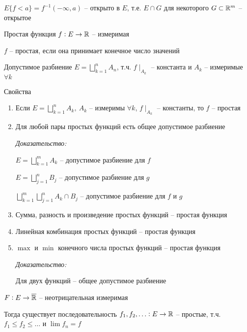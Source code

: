 \documentclass[12pt]{article}
\begin{document}
$E\{f < a\} = f^{-1}(-\infty, a)$ -- открыто в $E$, т.е. $E \cap G$ для некоторого $G \subset \mathbb R^m$ -- открытое 

\begin{defin}{Простая функция}
    $f : E \to \mathbb R$ -- измеримая

    $f$ -- простая, если она принимает конечное число значений 
\end{defin}

\begin{defin}{Допустимое разбиение}
    $E = \bigsqcup\limits_{k = 1}^n A_n$, т.ч. $f\mid_{A_k}$ -- константа и $A_k$ -- измеримые $\forall k$
\end{defin}

\begin{theo}{Свойства}
    \begin{enumerate}
        \item Если $E = \bigsqcup\limits_{k = 1}^n A_k,\ A_k$ -- измеримы $\forall k$, $f \mid_{A_k}$ -- константы, то $f$ -- простая
        \item Для любой пары простых функций есть общее допустимое разбиение 
        
        \textit{Доказательство:}

        $E = \bigsqcup\limits_{k = 1}^m A_k$ -- допустимое разбиение для $f$

        $E = \bigsqcup\limits_{j = 1}^n B_j$ -- допустимое разбиение для $g$

        $\bigsqcup\limits_{k = 1}^m \bigsqcup\limits_{j = 1}^n A_k \cap B_j$ -- допустимое разбиение для $f$ и $g$

        \item Сумма, разность и произведение простых функций -- простая функция 
        \item Линейная комбинация простых функций -- простая функция 
        \item $\max$ и $\min$ конечного числа простых функций -- простая функция 
        
        \textit{Доказательство:}

        Для двух функций -- общее допустимое разбиение
    \end{enumerate}
\end{theo}

\begin{theo}{}
    $F : E \to \overline{\mathbb R}$ -- неотрицательная измеримая 

    Тогда существует последовательность $f_1, f_2, \ldots : E \to \mathbb R$ -- простые, т.ч. $f_1 \leq f_2 \leq \ldots$ и $\lim f_n = f$
\end{theo}
\end{document}
